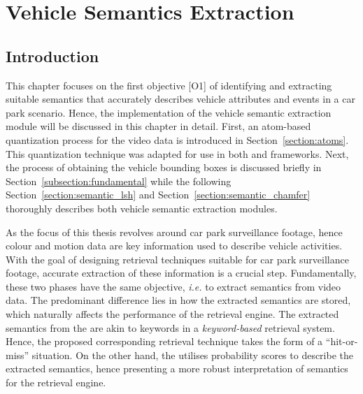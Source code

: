 \chapter{Vehicle Semantics Extraction}

\label{section:semanticsextraction}

\section{Introduction}

This chapter focuses on the first objective [O1] of identifying and extracting suitable semantics that accurately describes vehicle attributes and events in a car park scenario. Hence, the implementation of the vehicle semantic extraction module will be discussed in this chapter in detail.
First, an atom-based quantization process for the video data is introduced in Section~\ref{section:atoms}. This quantization technique was adapted for use in both \versionOneExt 
and \versionTwoExt frameworks. Next, the process of obtaining the vehicle bounding boxes is discussed briefly in Section~\ref{subsection:fundamental} while the following Section~\ref{section:semantic_lsh} and Section~\ref{section:semantic_chamfer} thoroughly describes both vehicle semantic extraction modules.


As the focus of this thesis revolves around car park surveillance footage, hence colour and motion data are key information used to describe vehicle activities. With the goal of designing retrieval techniques suitable for car park surveillance footage, accurate extraction of these information is a crucial step.
Fundamentally, these two phases have the same objective, \emph{i.e.} to extract semantics from video data.
The predominant difference lies in how the extracted semantics are stored, which naturally %
affects the performance of the retrieval engine. %
The extracted semantics from the \versionOneExt are akin to keywords in a \textit{keyword-based} retrieval system. Hence, the proposed corresponding retrieval technique takes the form of %
a ``hit-or-miss'' situation. On the other hand, the \versionTwoExt utilises probability scores to describe the extracted semantics, hence presenting a more robust interpretation of semantics for the retrieval engine.



